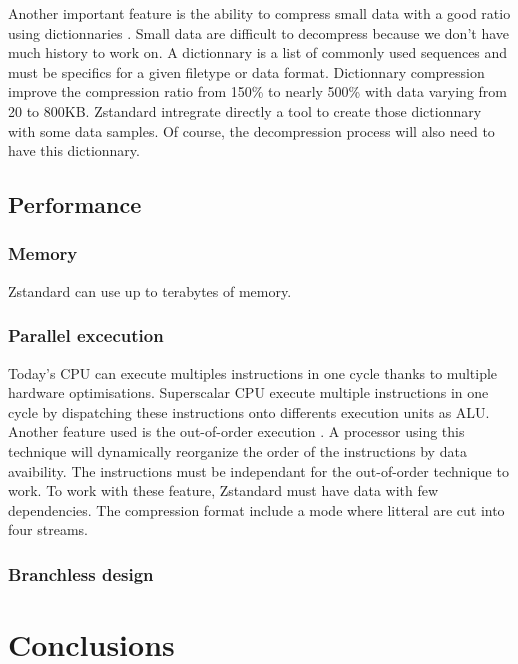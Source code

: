 \documentclass{sig-alternate-05-2015}
\begin{document}
    Another important feature is the ability to compress small data with a good ratio using
    dictionnaries \cite{dictionnary}. Small data are difficult to decompress because we don't have
    much history to work on. A dictionnary is a list of commonly used sequences and must be
    specifics for a given filetype or data format. Dictionnary compression improve the compression
    ratio from 150\% to nearly 500\% with data varying from 20 to 800KB. Zstandard intregrate
    directly a tool to create those dictionnary with some data samples. Of course, the decompression
    process will also need to have this dictionnary.

    \subsection{Performance}\label{sec:perf}
    \subsubsection{Memory}
        Zstandard can use up to terabytes of memory.

    \subsubsection{Parallel excecution}
        Today's CPU can execute multiples instructions in one cycle thanks to multiple hardware
        optimisations. Superscalar CPU \cite{superscalar} execute multiple instructions in one cycle
        by dispatching these instructions onto differents execution units as ALU. Another feature
        used is the out-of-order execution \cite{outoforder}. A processor using this technique will
        dynamically reorganize the order of the instructions by data avaibility. The instructions
        must be independant for the out-of-order technique to work. To work with these feature,
        Zstandard must have data with few dependencies. The compression format include a mode where
        litteral are cut into four streams.

    \subsubsection{Branchless design}

\section{Conclusions}
\end{document}
